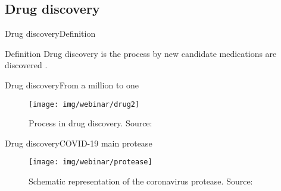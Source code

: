 \documentclass[10pt]{beamer}
\newcommand{\1}{
        	\setbeamertemplate{background}{
        		\texttt{[image: img/1]}
        		\tikz[overlay] \fill[fill opacity=0.75,fill=white] (0,0) rectangle (-\paperwidth,\paperheight);
        	}
}
\begin{document}
\subsection{Drug discovery}

\begin{frame}{Drug discovery}{Definition}
	\begin{block}{Definition}
		Drug discovery is the process by new candidate medications are discovered \cite{usafooddrug2020}.
	\end{block}
\end{frame}


\begin{frame}{Drug discovery}{From a million to one}
	\begin{figure}[]
		\centering
		\texttt{[image: img/webinar/drug2]}
		\label{img:mot2}
		\caption{Process in drug discovery. Source: \cite{chanin2020}}
	\end{figure}
\end{frame}

\begin{frame}{Drug discovery}{COVID-19 main protease}
	\begin{figure}[]
		\centering
		\texttt{[image: img/webinar/protease]}
		\label{img:mot2}
		\caption{Schematic representation of the coronavirus protease. Source: \cite{zhang2020crystal}}
	\end{figure}
\end{frame}
\end{document}
